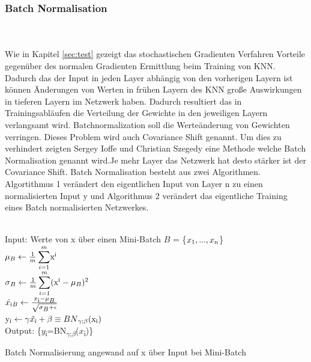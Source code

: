 \documentclass{llncs}
\begin{document}
	\subsubsection{Batch Normalisation}
	~\\\\
	Wie in Kapitel \ref{sec:test} gezeigt das stochastischen Gradienten Verfahren Vorteile gegenüber des normalen Gradienten Ermittlung beim Training von KNN. Dadurch das der Input in jeden Layer abhängig von den vorherigen Layern ist können Änderungen von Werten in frühen Layern des KNN große Auswirkungen in tieferen Layern im Netzwerk haben.
	Dadurch resultiert das in Trainingsabläufen die Verteilung der Gewichte in den jeweiligen Layern verlangsamt wird. Batchnormalization soll die Werteänderung von Gewichten verringen. Dieses Problem wird auch Covariance Shift genannt. Um dies zu verhindert zeigten Sergey Ioffe und Christian Szegedy \cite{batchnorm} eine Methode welche Batch Normalisation genannt wird.Je mehr Layer das Netzwerk hat desto stärker ist der Covariance Shift. Batch Normalisation besteht aus zwei Algorithmen. Algortithmus 1 verändert den eigentlichen Input von Layer n zu einen normalisierten Input y und Algorithmus 2 verändert das eigentliche Training eines Batch normalisierten Netzwerkes\cite{batchnorm}.
	\\\\
	\begin{algorithm}[H]
		Input: Werte von x über einen Mini-Batch $B$ = \{$x\textsubscript{1},...,x\textsubscript{n}$\}\\
		\begin{math}
		\mu\textsubscript{$B$}\leftarrow\frac{1}{m}\displaystyle\sum_{i=1}^{m}$x$\textsuperscript{i}
		\end{math}\\
		\begin{math}
		\sigma\textsubscript{$B$}\leftarrow\frac{1}{m}\displaystyle\sum_{i=1}^{m}($x$\textsuperscript{i} - \mu\textsubscript{$B$})\textsuperscript{2}
		\end{math}\\
		\begin{math}
		\hat{x\textsubscript{i}}\textsubscript{$B$}\leftarrow\frac{x\textsubscript{i}-\mu\textsubscript{$B$}}{\sqrt{\sigma\textsubscript{$B$} + \epsilon}}
		\end{math}\\
		\begin{math}
		$y$\textsubscript{i}\leftarrow\gamma\hat{x\textsubscript{i}} + \beta \equiv BN\textsubscript{$\gamma$;$\beta$}($x$\textsubscript{i})
		\end{math}\\
		Output: \{$y$\textsubscript{i}=BN\textsubscript{$\gamma$;$\beta$}($x$\textsubscript{i})\}
		\caption{Batch Normalisierung angewand auf x über Input bei Mini-Batch  }	
	\end{algorithm}
	
\end{document}
